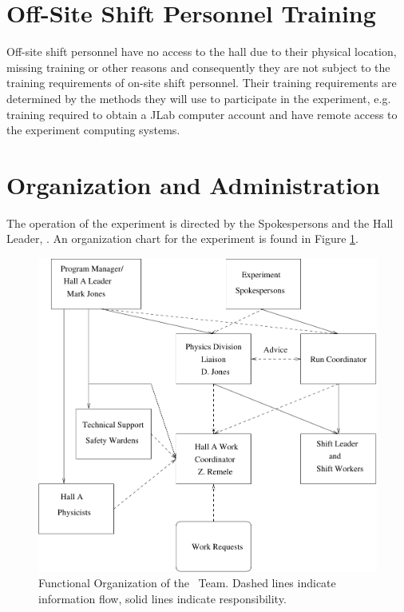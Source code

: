 \documentclass[10pt]{article}
\begin{document}
\section{Off-Site Shift Personnel Training}
Off-site shift personnel have no access to the hall due to their physical location, missing training or other
reasons and consequently they are not subject to the training requirements of on-site shift personnel. Their
training requirements are determined by the methods they will use to participate in the experiment, e.g.
training required to obtain a JLab computer account and have remote access to the experiment computing
systems.


\section{ Organization  and Administration}

The operation of the experiment is directed by the Spokespersons and the Hall 
Leader, \HALLLEADER. An organization chart for the experiment is
found in Figure \ref{HALLCHART}.

\begin{figure}
\includegraphics[width=\textwidth]{coo_HallAorg}
%
%
%
%
\caption[Dummy caption.]{Functional Organization of the \HALL\ Team. Dashed
lines indicate information flow, solid lines indicate responsibility.}
\label{HALLCHART} 
\end{figure}
\end{document}
